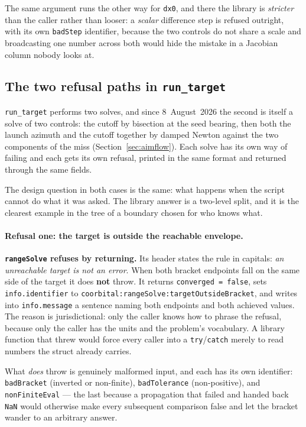 \documentclass[11pt]{article}
\newcommand{\code}[1]{\texttt{#1}}
\begin{document}
The same argument runs the other way for \code{dx0}, and there the library is
\emph{stricter} than the caller rather than looser: a \emph{scalar} difference
step is refused outright, with its own \code{badStep} identifier, because the
two controls do not share a scale and broadcasting one number across both would
hide the mistake in a Jacobian column nobody looks at.

\subsection{The two refusal paths in \code{run\_target}}

\code{run\_target} performs two solves, and since 8~August~2026 the second is
itself a solve of two controls: the cutoff by bisection at the seed bearing,
then both the launch azimuth and the cutoff together by damped Newton against
the two components of the miss (Section~\ref{sec:aimflow}). Each solve has its
own way of failing and each gets its own refusal, printed in the same format
and returned through the same fields.

The design question in both cases is the same: what happens when the script
cannot do what it was asked. The library answer is a two-level split, and it is
the clearest example in the tree of a boundary chosen for who knows what.

\paragraph{Refusal one: the target is outside the reachable envelope.}

\textbf{\code{rangeSolve} refuses by returning.} Its header states the rule in
capitals: \emph{an unreachable target is not an error}. When both bracket
endpoints fall on the same side of the target it does \textbf{not} throw. It
returns \code{converged = false}, sets \code{info.identifier} to
\code{coorbital:rangeSolve:targetOutsideBracket}, and writes into
\code{info.message} a sentence naming both endpoints and both achieved values.
The reason is jurisdictional: only the caller knows how to phrase the refusal,
because only the caller has the units and the problem's vocabulary. A library
function that threw would force every caller into a \code{try}/\code{catch}
merely to read numbers the struct already carries.

What \emph{does} throw is genuinely malformed input, and each has its own
identifier: \code{badBracket} (inverted or non-finite), \code{badTolerance}
(non-positive), and \code{nonFiniteEval} --- the last because a propagation
that failed and handed back \code{NaN} would otherwise make every subsequent
comparison false and let the bracket wander to an arbitrary answer.
\end{document}
